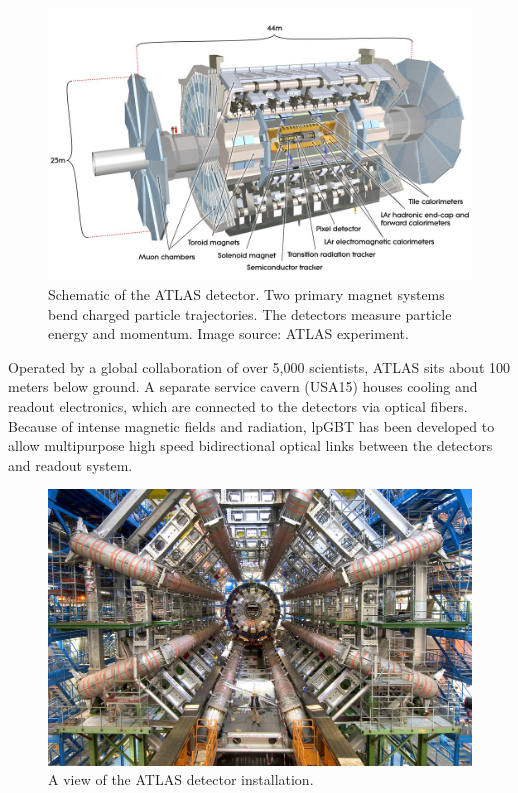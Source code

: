 \begin{figure}[H]
\centering
\includegraphics[width=\textwidth]{images/introduction/atlas-model.jpg}
\caption[Schematic of the ATLAS detector]{Schematic of the \acs{ATLAS} detector. Two primary magnet systems bend charged particle trajectories. The detectors measure particle energy and momentum. Image source: \acs{ATLAS} experiment. \protect\cite{atlas-experiment}}
\label{fig:atlas-model}
\end{figure}

Operated by a global collaboration of over 5,000 scientists, \acs{ATLAS} sits about 100 meters below ground. A separate service cavern (USA15) houses cooling and readout electronics, which are connected to the detectors via optical fibers. Because of intense magnetic fields and radiation, \acs{lpGBT} \cite{lpgbt} has been developed to allow multipurpose high speed bidirectional optical links between the detectors and readout system.

\begin{figure}[H]
\centering
\includegraphics[width=\textwidth]{images/introduction/atlas.jpg}
\caption{A view of the ATLAS detector installation. \protect\cite{atlas-experiment}}
\label{fig:atlas}
\end{figure}

